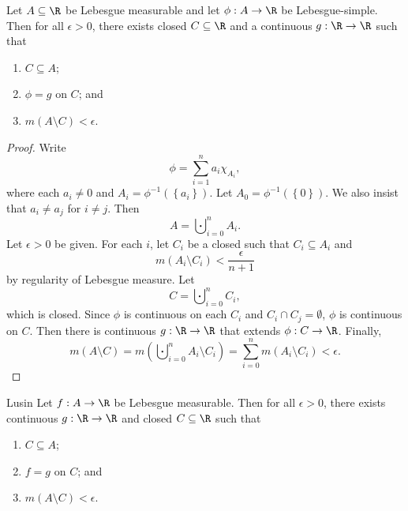 \documentclass[pmath451]{subfiles}
\begin{document}
    \begin{lemma}{}
        Let $A\subseteq\R$ be Lebesgue measurable and let $\phi:A\to\R$ be Lebesgue-simple. Then for all $\epsilon>0$, there exists closed $C\subseteq\R$ and a continuous $g:\R\to\R$ such that
        \begin{enumerate}
            \item $C\subseteq A$;
            \item $\phi=g$ on $C$; and
            \item $m\left( A\setminus C \right)<\epsilon$.
        \end{enumerate}
    \end{lemma}

    \clearpage

    \begin{proof}
        Write
        \begin{equation*}
            \phi = \sum^{n}_{i=1} a_i\chi_{A_i},
        \end{equation*}
        where each $a_i\neq 0$ and $A_i = \phi^{-1}\left( \left\lbrace a_i \right\rbrace \right)$. Let $A_0 = \phi^{-1}\left( \left\lbrace 0 \right\rbrace \right)$. We also insist that $a_i\neq a_j$ for $i\neq j$. Then
        \begin{equation*}
            A = \bigcupdot^{n}_{i=0} A_i.
        \end{equation*}
        Let $\epsilon>0$ be given. For each $i$, let $C_i$ be a closed such that $C_i\subseteq A_i$ and
        \begin{equation*}
            m\left( A_i\setminus C_i \right) < \frac{\epsilon}{n+1}
        \end{equation*}
        by regularity of Lebesgue measure. Let
        \begin{equation*}
            C = \bigcupdot^{n}_{i=0}C_i,
        \end{equation*}
        which is closed. Since $\phi$ is continuous on each $C_i$ and $C_i\cap C_j=\emptyset$, $\phi$ is continuous on $C$. Then there is continuous $g:\R\to\R$ that extends $\phi:C\to\R$. Finally,
        \begin{equation*}
            m\left( A\setminus C \right) = m\left( \bigcupdot^{n}_{i=0}A_i\setminus C_i \right) = \sum^{n}_{i=0} m\left( A_i\setminus C_i \right) < \epsilon.
        \end{equation*}
    \end{proof}
    
    \begin{theorem}{Lusin}
        Let $f:A\to\R$ be Lebesgue measurable. Then for all $\epsilon>0$, there exists continuous $g:\R\to\R$ and closed $C\subseteq\R$ such that
        \begin{enumerate}
            \item $C\subseteq A$;
            \item $f=g$ on $C$; and
            \item $m\left( A\setminus C \right)<\epsilon$.
        \end{enumerate}
    \end{theorem}
    
\end{document}
